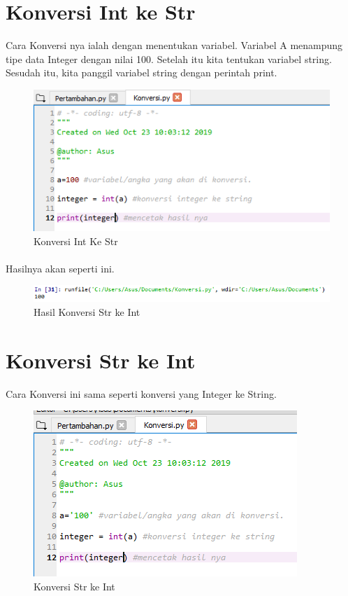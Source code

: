 \documentclass{article}
\begin{document}
\section{Konversi Int ke Str}
Cara Konversi nya ialah dengan menentukan variabel. Variabel A menampung tipe data Integer dengan nilai 100. Setelah itu kita tentukan variabel string. Sesudah itu, kita panggil variabel string dengan perintah print.
\begin{figure}[!htbp]
    \centering
    \includegraphics[scale=0.8]{KonvIntKeStr.PNG}
    \caption{Konversi Int Ke Str}
\end{figure}
\paragraph{}
Hasilnya akan seperti ini.
\begin{figure}[!htbp]
    \centering
    \includegraphics[scale=0.6]{HasilKonvIntKeStr.PNG}
    \caption{Hasil Konversi Str ke Int}
\end{figure}
\newpage
\section{Konversi Str ke Int}
Cara Konversi ini sama seperti konversi yang Integer ke String.
\begin{figure}[!htbp]
    \centering
    \includegraphics{KonvStrKeInt.PNG}
    \caption{Konversi Str ke Int}
\end{figure}
\end{document}
